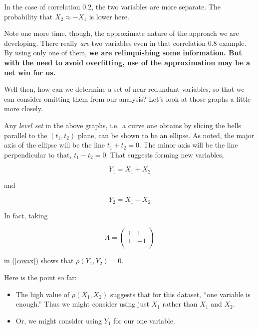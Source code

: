 In the case of correlation 0.2, the two variables are more separate.
The probability that $X_2 \approx -X_1$ is lower here.

Note one more time, though, the approximate nature of the approach we
are developing.  There really \textit{are} two variables even in that
correlation 0.8 example.  By using only one of them, \textbf{we are
relinquishing some information.  But with the need to avoid overfitting,
use of the approximation may be a net win for us.}

Well then, how can we determine a set of near-redundant variables, so
that we can consider omitting them from our analysis?  Let's look at
those graphs a little more closely.

Any \textit{level set} in the above graphs, i.e.\ a curve one
obtains by slicing the bells parallel to the $(t_1,t_2)$ plane, can be
shown to be an ellipse.  As noted, the major axis of the ellipse will be
the line $t_1 + t_2 = 0$.  The minor axis will be the line perpendicular
to that, $t_1 - t_2 = 0$.  That suggests forming new variables,

\begin{equation}
Y_1 = X_1 + X_2 
\end{equation}

and 

\begin{equation}
Y_2 = X_1 - X_2 
\end{equation}

In fact, taking

\begin{equation}
A = 
\left (
\begin{array}{rr}
1 & 1 \\
1 & -1 \\
\end{array}
\right )
\end{equation}

in (\ref{covax}) shows that $\rho(Y_1,Y_2) = 0$.

Here is the point so far:

\begin{itemize}

\item The high value of $\rho(X_1,X_2)$ suggests that for this dataset,
``one variable is enough.''  Thus we might consider using just $X_1$
rather than $X_1$ and $X_2$.

\item Or, we might consider using $Y_1$ for our one
variable.  

\end{itemize} 

